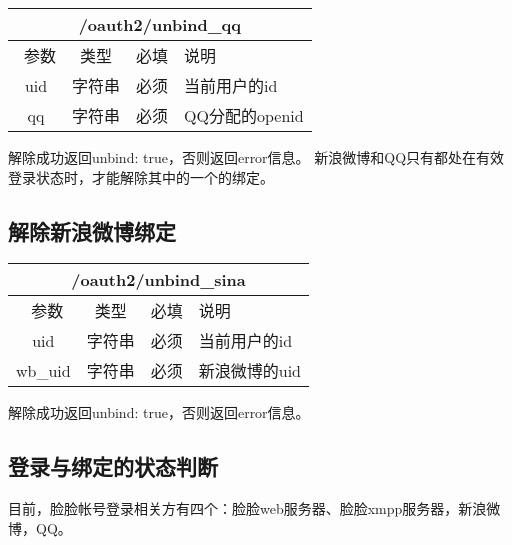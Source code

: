 \begin{table}[H]
   \begin{center}
\begin{tabular}{|c|c|c|p{12cm}|}
\hline
\multicolumn{4}{|c|}{/oauth2/unbind\_qq} \\
\hline\hline
 \  参数  & 类型 & 必填 &  说明  \\
\hline
    uid  & 字符串 & 必须 &  当前用户的id\\
\hline
    qq  & 字符串 & 必须 &  QQ分配的openid\\    
\hline
\end{tabular}
   \end{center}
\end{table}
解除成功返回{unbind: true}，否则返回error信息。
新浪微博和QQ只有都处在有效登录状态时，才能解除其中的一个的绑定。


\subsection{解除新浪微博绑定}

\begin{table}[H]
   \begin{center}
\begin{tabular}{|c|c|c|p{12cm}|}
\hline
\multicolumn{4}{|c|}{/oauth2/unbind\_sina} \\
\hline\hline
 \  参数  & 类型 & 必填 &  说明  \\
\hline
    uid  & 字符串 & 必须 &  当前用户的id\\
\hline
    wb\_uid  & 字符串 & 必须 &  新浪微博的uid\\    
\hline
\end{tabular}
   \end{center}
\end{table}
解除成功返回{unbind: true}，否则返回error信息。


\subsection{登录与绑定的状态判断}
目前，脸脸帐号登录相关方有四个：脸脸web服务器、脸脸xmpp服务器，新浪微博，QQ。

